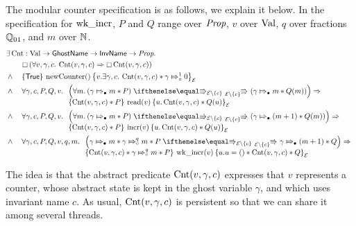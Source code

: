 The modular counter specification is as follows, we explain it below.
In the specification for $\operatorname{wk{\_}incr}$, $P$ and $Q$ range over $\textit{Prop}$, $v$ over $\text{Val}$, $q$ over fractions $\mathbb{Q}_{01}$, and $m$ over $\mathbb{N}$.
\begin{align*}
  & \Exists \Cnt : \Val \to \textlog{GhostName} \to \textlog{InvName} \to \Prop.\\
  & \qquad \persistently\left(\All v, \gamma, c. \Cnt(v,\gamma,c) \implies \persistently \Cnt(v,\gamma,c)\right) \\
  & \land \quad\hoare{\TRUE}{\newC()}{v.\Exists \gamma, c.  \Cnt(v,\gamma,c) \ast \abstractstate{\gamma}{1}{0}}[\mask] \\
  & \land \quad\All \gamma, c, P, Q, v.
    \begin{array}[t]{l}
    \left(\All m. (\abstractstateauth{\gamma}{m} \ast P) \vs[\mask\setminus{\{\CntInvName\}}]
    (\abstractstateauth{\gamma}{m} \ast Q(m))\right) \implies \\
      \hoare{\Cnt(v,\gamma, c) \ast P}{\readC(v)}{u. \Cnt(v,\gamma, c) \ast Q(u)}[\mask]
    \end{array}\\
  & \land \quad\All \gamma, c, P, Q, v.
    \begin{array}[t]{l}
    \left(\All m. (\abstractstateauth{\gamma}{m} \ast P) \vs[\mask\setminus{\{\CntInvName\}}]
    \left(\abstractstateauth{\gamma}{(m+1)} \ast Q(m)\right)\right) \implies \\
      \hoare{\Cnt(v,\gamma,c) \ast P}{\incrC(v)}{u. \Cnt(v,\gamma,c) \ast Q(u)}[\mask]
    \end{array}\\
  & \land \quad \All \gamma, c, P, Q, v, q, m.
    \begin{array}[t]{l}
    \left(\abstractstateauth{\gamma}{m} \ast \abstractstate{\gamma}{q}{m} \ast P \vs[\mask\setminus{\{\CntInvName\}}]
     \abstractstateauth{\gamma}{(m+1)}  \ast Q\right) \implies \\
      \hoare{\Cnt(v,\gamma,c) \ast \abstractstate{\gamma}{q}{m}\ast P}{\wkincrC(v)}{u. u=\TT \ast \Cnt(v,\gamma,c) \ast Q}[\mask]
    \end{array}
\end{align*}

The idea is that the abstract predicate $\operatorname{Cnt}(v,\gamma,c)$ expresses that $v$ represents a counter, whose abstract state is kept in the ghost variable $\gamma$,
and which uses invariant name $c$.
As usual, $\operatorname{Cnt}(v,\gamma,c)$ is persistent so that we can share it among several threads.

